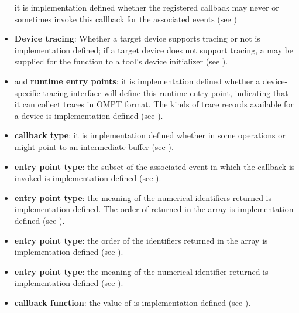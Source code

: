 \begin{itemize}
      it is implementation defined whether the registered callback may never or 
      sometimes invoke this callback for the associated events (see 
      )
\item \textbf{Device tracing}: Whether a target device supports tracing or 
      not is implementation defined; if a target device does not support tracing, 
      a  may be supplied for the  function to a tool's 
      device initializer (see ).
\item {} and  
      \textbf{runtime entry points}: it is implementation defined whether 
      a device-specific tracing interface will define this runtime entry 
      point, indicating that it can collect traces in OMPT format. The kinds 
      of trace records available for a device is implementation defined 
      (see ).
\item {} \textbf{callback type}: it is 
      implementation defined whether in some operations  or 
       might point to an intermediate buffer 
      (see ).
\item {} \textbf{entry point type}: the subset
      of the associated event in which the callback is invoked is
      implementation defined (see ).
\item {} \textbf{entry point type}: the meaning 
      of the numerical identifiers returned is implementation defined.  The 
      order of  returned in the array is implementation defined (see 
      ).
\item {} \textbf{entry point type}:
      the order of the identifiers returned in the array 
      is implementation defined (see ).
\item {} \textbf{entry point type}: the meaning of the 
      numerical identifier returned is implementation defined 
      (see ).
\item {} \textbf{callback function}:
      the value of  is implementation defined (see
      ).

\end{itemize}
